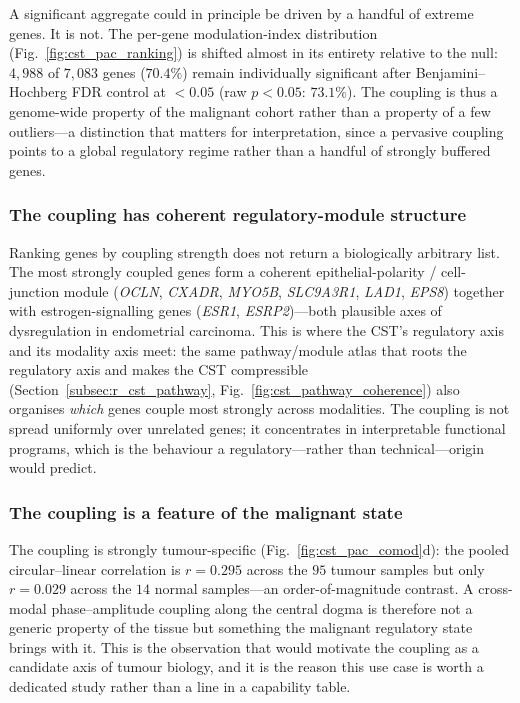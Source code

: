 \documentclass[preprint,12pt,amsmath,amssymb,superscriptaddress,floatfix]{revtex4-2}
\begin{document}
A significant aggregate could in principle be driven by a handful of extreme
genes. It is not. The per-gene modulation-index distribution
(Fig.~\ref{fig:cst_pac_ranking}) is shifted almost in its entirety relative to the
null: $4{,}988$ of $7{,}083$ genes ($70.4\%$) remain individually significant
after Benjamini--Hochberg FDR control at $<0.05$ (raw $p<0.05$: $73.1\%$). The
coupling is thus a genome-wide property of the malignant cohort rather than a
property of a few outliers---a distinction that matters for interpretation, since
a pervasive coupling points to a global regulatory regime rather than a handful of
strongly buffered genes.

\subsubsection{The coupling has coherent regulatory-module structure}

Ranking genes by coupling strength does not return a biologically arbitrary list.
The most strongly coupled genes form a coherent epithelial-polarity /
cell-junction module (\textit{OCLN}, \textit{CXADR}, \textit{MYO5B},
\textit{SLC9A3R1}, \textit{LAD1}, \textit{EPS8}) together with estrogen-signalling
genes (\textit{ESR1}, \textit{ESRP2})---both plausible axes of dysregulation in
endometrial carcinoma. This is where the CST's regulatory axis and its modality
axis meet: the same pathway/module atlas that roots the regulatory axis and makes
the CST compressible (Section~\ref{subsec:r_cst_pathway},
Fig.~\ref{fig:cst_pathway_coherence}) also organises \emph{which} genes couple
most strongly across modalities. The coupling is not spread uniformly over
unrelated genes; it concentrates in interpretable functional programs, which is
the behaviour a regulatory---rather than technical---origin would predict.

\subsubsection{The coupling is a feature of the malignant state}

The coupling is strongly tumour-specific (Fig.~\ref{fig:cst_pac_comod}d): the
pooled circular--linear correlation is $r=0.295$ across the $95$ tumour samples but
only $r=0.029$ across the $14$ normal samples---an order-of-magnitude contrast. A
cross-modal phase--amplitude coupling along the central dogma is therefore not a
generic property of the tissue but something the malignant regulatory state
brings with it. This is the observation that would motivate the coupling as a
candidate axis of tumour biology, and it is the reason this use case is worth a
dedicated study rather than a line in a capability table.
\end{document}
